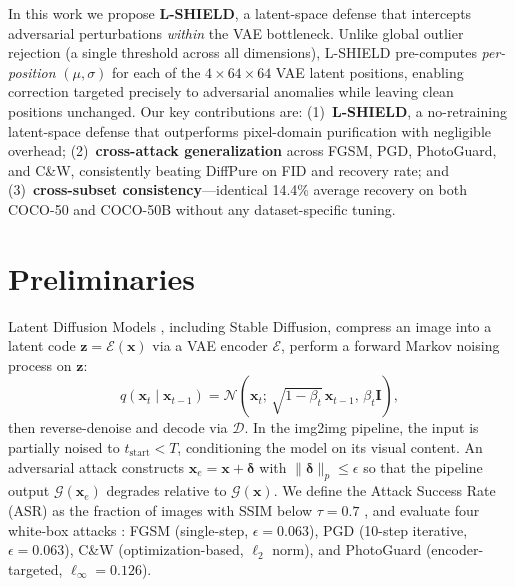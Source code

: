 \documentclass[conference]{IEEEtran}
\begin{document}
In this work we propose \textbf{L-SHIELD}, a latent-space defense that
intercepts adversarial perturbations \emph{within} the VAE bottleneck.
Unlike global outlier rejection (a single threshold across all dimensions),
L-SHIELD pre-computes \emph{per-position} $(\mu,\sigma)$ for each of the
$4\!\times\!64\!\times\!64$ VAE latent positions, enabling correction targeted
precisely to adversarial anomalies while leaving clean positions unchanged. Our key contributions are: (1)~\textbf{L-SHIELD}, a no-retraining latent-space
defense that outperforms pixel-domain purification with negligible overhead;
(2)~\textbf{cross-attack generalization} across FGSM, PGD, PhotoGuard, and C\&W,
consistently beating DiffPure on FID and recovery rate; and
(3)~\textbf{cross-subset consistency}---identical 14.4\% average recovery on
both COCO-50 and COCO-50B without any dataset-specific tuning.

\section{Preliminaries}

Latent Diffusion Models \cite{ho2020denoising,rombach2022high}, including
Stable Diffusion, compress an image into a latent code
$\mathbf{z}\!=\!\mathcal{E}(\mathbf{x})$ via a VAE encoder $\mathcal{E}$,
perform a forward Markov noising process on $\mathbf{z}$:
\begin{equation}
  q(\mathbf{x}_t \mid \mathbf{x}_{t-1}) =
  \mathcal{N}\!\left(\mathbf{x}_t;\,\sqrt{1-\beta_t}\,\mathbf{x}_{t-1},\,
  \beta_t \mathbf{I}\right),
\end{equation}
then reverse-denoise and decode via $\mathcal{D}$. In the img2img pipeline,
the input is partially noised to $t_{\text{start}} < T$, conditioning the
model on its visual content. An adversarial attack constructs
$\mathbf{x}_e = \mathbf{x} + \boldsymbol{\delta}$ with
$\|\boldsymbol{\delta}\|_p \leq \epsilon$ so that the pipeline output
$\mathcal{G}(\mathbf{x}_e)$ degrades relative to $\mathcal{G}(\mathbf{x})$.
We define the Attack Success Rate (ASR) as the fraction of images with SSIM
below $\tau\!=\!0.7$ \cite{salman2023raising}, and evaluate four white-box
attacks \cite{costa2024deep}: FGSM \cite{goodfellow2015explaining} (single-step,
$\epsilon\!=\!0.063$), PGD \cite{madry2018towards} (10-step iterative,
$\epsilon\!=\!0.063$), C\&W \cite{carlini2017evaluating} (optimization-based,
$\ell_2$ norm), and PhotoGuard \cite{salman2023raising} (encoder-targeted,
$\ell_\infty\!=\!0.126$).
\end{document}
